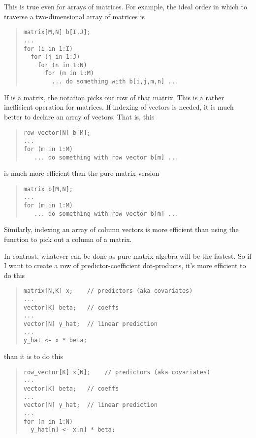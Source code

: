 This is true even for arrays of matrices.  For example, the ideal
order in which to traverse a two-dimensional array of matrices is
%
\begin{quote}
\begin{Verbatim}
matrix[M,N] b[I,J];
...
for (i in 1:I)
  for (j in 1:J)
    for (n in 1:N)
      for (m in 1:M)
        ... do something with b[i,j,m,n] ...
\end{Verbatim}
\end{quote}

If  is a matrix, the notation  picks out row
 of that matrix.  This is a rather inefficient operation for
matrices.  If indexing of vectors is needed, it is much better to
declare an array of vectors.  That is, this
%
\begin{quote}
\begin{Verbatim}
row_vector[N] b[M];
...
for (m in 1:M)
   ... do something with row vector b[m] ...
\end{Verbatim}
\end{quote}
%
is much more efficient than the pure matrix version
%
\begin{quote}
\begin{Verbatim}
matrix b[M,N];
...
for (m in 1:M)
   ... do something with row vector b[m] ...
\end{Verbatim}
\end{quote}
%
Similarly, indexing an array of column vectors is more efficient than
using the  function to pick out a column of a matrix.

In contrast, whatever can be done as pure matrix algebra will be the
fastest.  So if I want to create a row of predictor-coefficient
dot-products, it's more efficient to do this
%
\begin{quote}
\begin{Verbatim}
matrix[N,K] x;    // predictors (aka covariates)
...
vector[K] beta;   // coeffs
...
vector[N] y_hat;  // linear prediction
...
y_hat <- x * beta;
\end{Verbatim}
\end{quote}
%
than it is to do this
%
\begin{quote}
\begin{Verbatim}
row_vector[K] x[N];    // predictors (aka covariates)
...
vector[K] beta;   // coeffs
...
vector[N] y_hat;  // linear prediction
...
for (n in 1:N)
  y_hat[n] <- x[n] * beta;
\end{Verbatim}
\end{quote}

